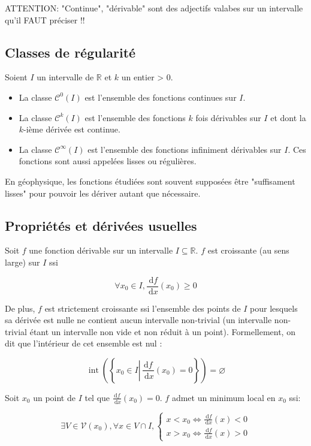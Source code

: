 ATTENTION: "Continue", "dérivable" sont des adjectifs valabes sur un intervalle qu'il FAUT préciser !!

\subsection{Classes de régularité}

Soient $I$ un intervalle de $\mathbb{R}$ et $k$ un entier > 0.
\begin{itemize}
    \item La classe $\mathcal{C}^0(I)$ est l'ensemble des fonctions continues sur $I$.
    \item La classe $\mathcal{C}^k(I)$ est l'ensemble des fonctions $k$ fois dérivables sur $I$ et dont la $k$-ième dérivée est continue.
    \item La classe $\mathcal{C}^{\infty}(I)$ est l'ensemble des fonctions infiniment dérivables sur $I$. Ces fonctions sont aussi appelées lisses ou régulières.
\end{itemize}

En géophysique, les fonctions étudiées sont souvent supposées être "suffisament lisses" pour pouvoir les dériver autant que nécessaire.

\subsection{Propriétés et dérivées usuelles}
Soit $f$ une fonction dérivable sur un intervalle $I \subseteq \mathbb{R}$.
$f$ est croissante (au sens large) sur $I$ ssi

$$
\forall x_0 \in I, \frac{\mathrm{~d} f}{\mathrm{~d} x}\left(x_0\right) \geqslant 0
$$


De plus, $f$ est strictement croissante ssi l'ensemble des points de $I$ pour lesquels sa dérivée est nulle ne contient aucun intervalle non-trivial (un intervalle non-trivial étant un intervalle non vide et non réduit à un point). Formellement, on dit que l'intérieur de cet ensemble est nul :

$$
\operatorname{int}\left(\left\{x_0 \in I \left\lvert\, \frac{\mathrm{d} f}{\mathrm{~d} x}\left(x_0\right)=0\right.\right\}\right)=\varnothing
$$

Soit $x_0$ un point de $I$ tel que $\frac{\mathrm{d} f}{\mathrm{~d} x}\left(x_0\right)=0$. $f$ admet un minimum local en $x_0$ ssi:

$$
\exists V \in \mathcal{V}\left(x_0\right), \forall x \in V \cap I,\left\{\begin{array}{l}
x<x_0 \Longleftrightarrow \frac{\mathrm{~d} f}{\mathrm{~d} x}(x)<0 \\
x>x_0 \Longleftrightarrow \frac{\mathrm{~d} f}{\mathrm{~d} x}(x)>0
\end{array}\right.
$$

